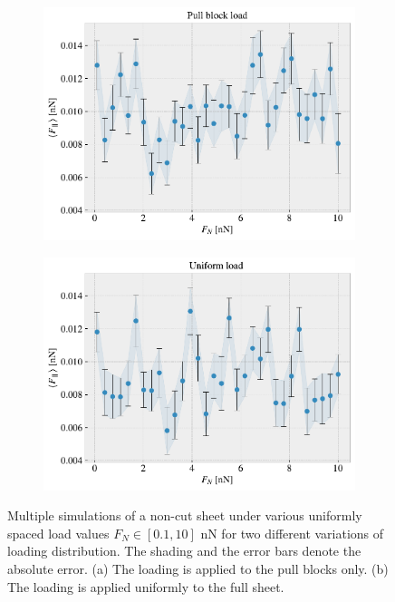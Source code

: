 \begin{figure}[H]
  \centering
  \begin{subfigure}[t]{0.49\textwidth}
      \centering
      \includegraphics[width=\textwidth]{figures/baseline/load_dist_a.pdf}
      \caption{}
      \label{fig:load_dist_a}
  \end{subfigure}
  \hfill
  \begin{subfigure}[t]{0.49\textwidth}
      \centering
      \includegraphics[width=\textwidth]{figures/baseline/load_dist_b.pdf}
      \caption{}
      \label{fig:load_dist_b}
  \end{subfigure}
  \hfill
     \caption{Multiple simulations of a non-cut sheet under various uniformly spaced load values $F_N \in [0.1, 10]$ nN for two different variations of loading distribution. The shading and the error bars denote the absolute error. (a) The loading is applied to the pull blocks only. (b) The loading is applied uniformly to the full sheet. }
     \label{fig:load_dist}
\end{figure}

